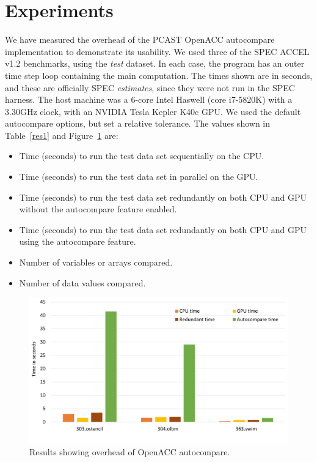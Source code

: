 \section{Experiments}

We have measured the overhead of the PCAST OpenACC autocompare implementation to demonstrate its usability.
We used three of the SPEC ACCEL v1.2 benchmarks, using the \emph{test} dataset.
In each case, the program has an outer time step loop containing the main computation.
The times shown are in seconds, and these are officially SPEC \emph{estimates}, since they were not run in the SPEC harness.
The host machine was a 6-core Intel Haswell (core i7-5820K) with a 3.30GHz clock, with an NVIDIA Tesla Kepler K40c GPU.
We used the default autocompare options, but set a relative tolerance.
The values shown in Table~\ref{res1} and Figure~\ref{fig:sle_figure} are:
\begin{itemize}
\item Time (seconds) to run the test data set sequentially on the CPU.
\item Time (seconds) to run the test data set in parallel on the GPU.
\item Time (seconds) to run the test data set redundantly on both CPU and GPU without the autocompare feature enabled.
\item Time (seconds) to run the test data set redundantly on both CPU and GPU using the autocompare feature.
\item Number of variables or arrays compared.
\item Number of data values compared.
\end{itemize}


\begin{figure}[t]
    \centering
    \includegraphics [width=1\linewidth] {Table1.pdf}
    \caption{Results showing overhead of OpenACC autocompare.}
    \label{fig:sle_figure}
\end{figure}


